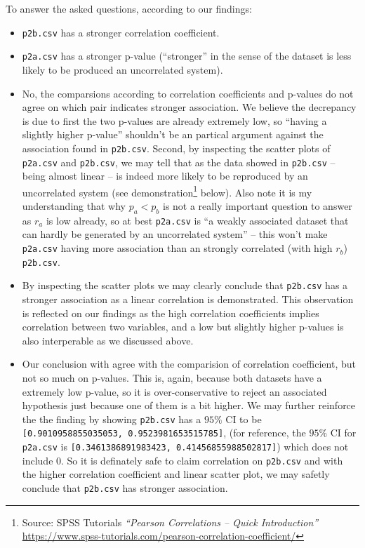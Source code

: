 \documentclass[12pt]{article}
\newcommand{\ilc}{\texttt}
\begin{document}
To answer the asked questions, according to our findings:

\begin{itemize}
    \item \ilc{p2b.csv} has a stronger correlation coefficient.
    \item \ilc{p2a.csv} has a stronger p-value (``stronger'' in the sense of the dataset is less likely to be produced an uncorrelated system).
    \item No, the comparsions according to correlation coefficients and p-values do not agree on which pair indicates stronger association. We believe the decrepancy is due to first the two p-values are already extremely low, so ``having a slightly higher p-value'' shouldn't be an partical argument against the association found in \ilc{p2b.csv}. Second, by inspecting the scatter plots of \ilc{p2a.csv} and \ilc{p2b.csv}, we may tell that as the data showed in \ilc{p2b.csv} -- being almost linear -- is indeed more likely to be reproduced by an uncorrelated system (see demonstration\footnote{Source: SPSS Tutorials \textit{``Pearson Correlations -- Quick Introduction''} \url{https://www.spss-tutorials.com/pearson-correlation-coefficient/}} below). Also note it is my understanding that why $p_a < p_b$ is not a really important question to answer as $r_a$ is low already, so at best \ilc{p2a.csv} is ``a weakly associated dataset that can hardly be generated by an uncorrelated system'' -- this won't make \ilc{p2a.csv} having more association than an strongly correlated (with high $r_b$) \ilc{p2b.csv}.
    \item By inspecting the scatter plots we may clearly conclude that \ilc{p2b.csv} has a stronger association as a linear correlation is demonstrated. This observation is reflected on our findings as the high correlation coefficients implies correlation between two variables, and a low but slightly higher p-values is also interperable as we discussed above.
    \item Our conclusion with agree with the comparision of correlation coefficient, but not so much on p-values. This is, again, because both datasets have a extremely low p-value, so it is over-conservative to reject an associated hypothesis just because one of them is a bit higher. We may further reinforce the the finding by showing \ilc{p2b.csv} has a $95\%$ CI to be \ilc{[0.9010958855035053, 0.9523981653515785]}, (for reference, the $95\%$ CI for \ilc{p2a.csv} is \ilc{[0.3461386891983423, 0.41456855988502817]}) which does not include 0. So it is definately safe to claim correlation on \ilc{p2b.csv} and with the higher correlation coefficient and linear scatter plot, we may safetly conclude that \ilc{p2b.csv} has stronger association.
\end{itemize}
\end{document}

